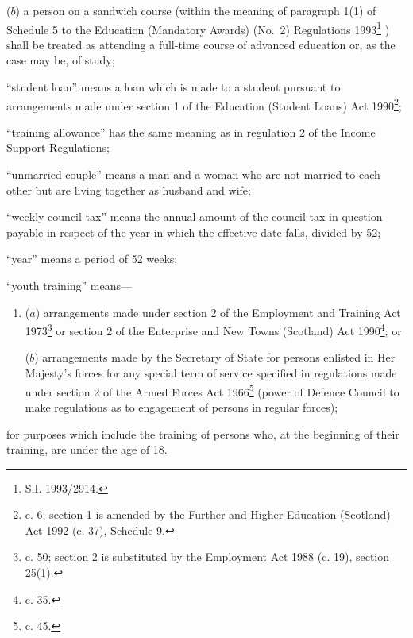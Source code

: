 \documentclass[12pt,a4paper]{article}
\begin{document}
\begin{enumerate}
\begin{enumerate}
($b$)
a person on a sandwich course (within the meaning of paragraph 1(1) of Schedule 5 to the 
Education (Mandatory Awards) (No.\ 2) Regulations 1993\footnote{\frenchspacing S.I. 1993/2914.}%
) shall be treated as attending a full-time course of advanced education or, as the case may be, of study;
\end{enumerate}

“student loan” means a loan which is made to a student pursuant to arrangements made under section 1 of the Education (Student Loans) Act 1990\footnote{ c. 6; section 1 is amended by the Further and Higher Education (Scotland) Act 1992 (c. 37), Schedule 9.};


“training allowance” has the same meaning as in regulation 2 of the Income Support Regulations;

“unmarried couple” means a man and a woman who are not married to each other but are living together as husband and wife;

“weekly council tax” means the annual amount of the council tax in question payable in respect of the year in which the effective date falls, divided by 52;

“year” means a period of 52 weeks;

“youth training” means—
\begin{enumerate}\item[]
($a$)
arrangements made under section 2 of the Employment and Training Act 1973\footnote{ c. 50; section 2 is substituted by the Employment Act 1988 (c. 19), section 25(1).} or section 2 of the Enterprise and New Towns (Scotland) Act 1990\footnote{ c. 35.}; or

($b$)
arrangements made by the Secretary of State for persons enlisted in Her Majesty’s forces for any special term of service specified in regulations made under section 2 of the Armed Forces Act 1966\footnote{ c. 45.} (power of Defence Council to make regulations as to engagement of persons in regular forces);
\end{enumerate}

for purposes which include the training of persons who, at the beginning of their training, are under the age of 18.
\end{enumerate}
\end{document}
